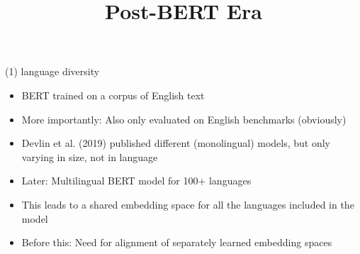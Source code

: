 



\newcommand{\titlefigure}{figure/bertology.png}
\newcommand{\learninggoals}{
\item Understand how impactful this architecture was
\item See how this changed research in the field
\item Glimpse into BERTology}

\title{Post-BERT Era}
\date{}




\begin{frame}{(1) language diversity}

\vfill

	\begin{itemize}
		\item BERT trained on a corpus of English text
		\item More importantly: Also only evaluated on English benchmarks (obviously)
		\item Devlin et al. (2019) published different (monolingual) models, but only varying in size, not in language
		\item Later: Multilingual BERT model  for 100+ languages
		\item This leads to a shared embedding space for all the languages included in the model
		\item Before this: Need for alignment of separately learned embedding spaces
	\end{itemize}

\vfill

\end{frame}


